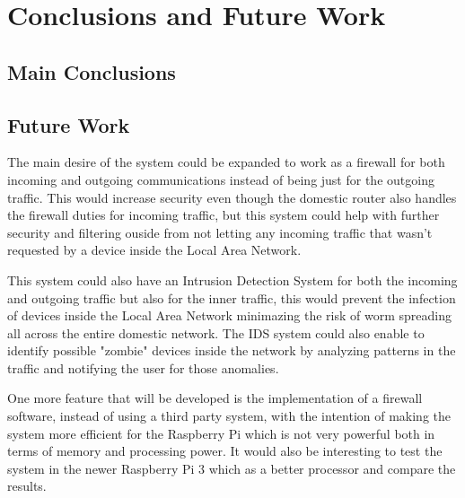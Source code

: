 \chapter{Conclusions and Future Work}
\label{chap:conc-future-work}

\section{Main Conclusions}
\label{sec:main-concs}


\section{Future Work}
\label{sec:future-work}

The main desire of the system could be expanded to work as a firewall for both
incoming and outgoing communications instead of being just for the outgoing
traffic. This would increase security even though the domestic router also
handles the firewall duties for incoming traffic, but this system could help
with further security and filtering ouside from not letting any incoming traffic
that wasn't requested by a device inside the Local Area Network.

This system could also have an Intrusion Detection System for both the incoming
and outgoing traffic but also for the inner traffic, this would prevent the
infection of devices inside the Local Area Network minimazing the risk of worm
spreading all across the entire domestic network. The IDS system could also
enable to identify possible "zombie" devices inside the network by analyzing
patterns in the traffic and notifying the user for those anomalies.

One more feature that will be developed is the implementation of a firewall
software, instead of using a third party system, with the intention of making
the system more efficient for the Raspberry Pi which is not very powerful both
in terms of memory and processing power. It would also be interesting to test
the system in the newer Raspberry Pi 3 which as a better processor and compare
the results.

